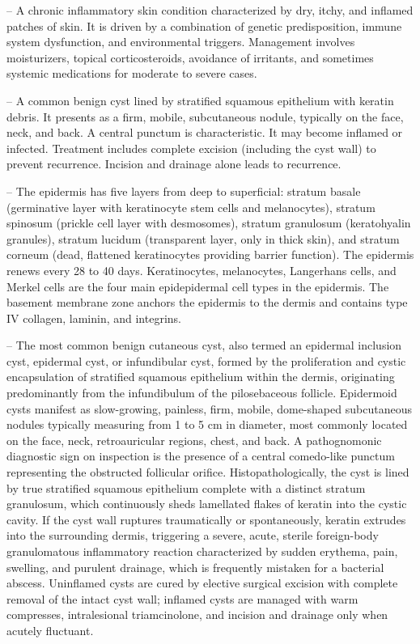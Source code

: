 -- A chronic inflammatory skin condition characterized by dry, itchy, and inflamed patches of skin. It is driven by a combination of genetic predisposition, immune system dysfunction, and environmental triggers. Management involves moisturizers, topical corticosteroids, avoidance of irritants, and sometimes systemic medications for moderate to severe cases.

-- A common benign cyst lined by stratified squamous epithelium with keratin debris. It presents as a firm, mobile, subcutaneous nodule, typically on the face, neck, and back. A central punctum is characteristic. It may become inflamed or infected. Treatment includes complete excision (including the cyst wall) to prevent recurrence. Incision and drainage alone leads to recurrence.

-- The epidermis has five layers from deep to superficial: stratum basale (germinative layer with keratinocyte stem cells and melanocytes), stratum spinosum (prickle cell layer with desmosomes), stratum granulosum (keratohyalin granules), stratum lucidum (transparent layer, only in thick skin), and stratum corneum (dead, flattened keratinocytes providing barrier function). The epidermis renews every 28 to 40 days. Keratinocytes, melanocytes, Langerhans cells, and Merkel cells are the four main epidepidermal cell types in the epidermis. The basement membrane zone anchors the epidermis to the dermis and contains type IV collagen, laminin, and integrins.

-- The most common benign cutaneous cyst, also termed an epidermal inclusion cyst, epidermal cyst, or infundibular cyst, formed by the proliferation and cystic encapsulation of stratified squamous epithelium within the dermis, originating predominantly from the infundibulum of the pilosebaceous follicle. Epidermoid cysts manifest as slow-growing, painless, firm, mobile, dome-shaped subcutaneous nodules typically measuring from 1 to 5 cm in diameter, most commonly located on the face, neck, retroauricular regions, chest, and back. A pathognomonic diagnostic sign on inspection is the presence of a central comedo-like punctum representing the obstructed follicular orifice. Histopathologically, the cyst is lined by true stratified squamous epithelium complete with a distinct stratum granulosum, which continuously sheds lamellated flakes of keratin into the cystic cavity. If the cyst wall ruptures traumatically or spontaneously, keratin extrudes into the surrounding dermis, triggering a severe, acute, sterile foreign-body granulomatous inflammatory reaction characterized by sudden erythema, pain, swelling, and purulent drainage, which is frequently mistaken for a bacterial abscess. Uninflamed cysts are cured by elective surgical excision with complete removal of the intact cyst wall; inflamed cysts are managed with warm compresses, intralesional triamcinolone, and incision and drainage only when acutely fluctuant.

